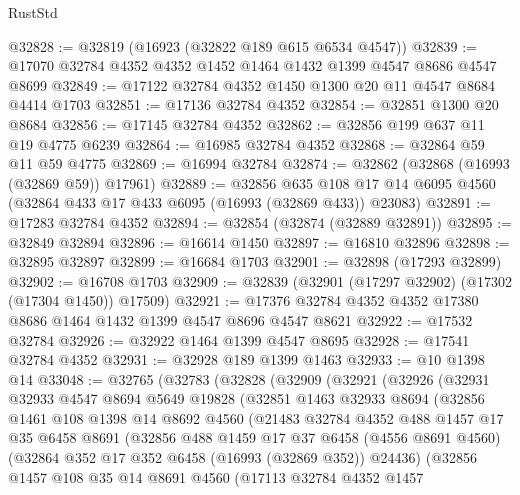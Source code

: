 \begin{lexlean}{RustStd}
\begin{coremodule}
@32828 := @32819 (@16923 (@32822 @189 @615 @6534 @4547))
@32839 := @17070 @32784 @4352 @4352 @1452 @1464 @1432 @1399 @4547 @8686 @4547 @8699
@32849 := @17122 @32784 @4352 @1450 @1300 @20 @11 @4547 @8684 @4414 @1703
@32851 := @17136 @32784 @4352
@32854 := @32851 @1300 @20 @8684
@32856 := @17145 @32784 @4352
@32862 := @32856 @199 @637 @11 @19 @4775 @6239
@32864 := @16985 @32784 @4352
@32868 := @32864 @59 @11 @59 @4775
@32869 := @16994 @32784
@32874 := @32862 (@32868 (@16993 (@32869 @59)) @17961)
@32889 := @32856
    @635
    @108
    @17
    @14
    @6095
    @4560
    (@32864 @433 @17 @433 @6095 (@16993 (@32869 @433)) @23083)
@32891 := @17283 @32784 @4352
@32894 := @32854 (@32874 (@32889 @32891))
@32895 := @32849 @32894
@32896 := @16614 @1450
@32897 := @16810 @32896
@32898 := @32895 @32897
@32899 := @16684 @1703
@32901 := @32898 (@17293 @32899)
@32902 := @16708 @1703
@32909 := @32839 (@32901 (@17297 @32902) (@17302 (@17304 @1450)) @17509)
@32921 := @17376 @32784 @4352 @4352 @17380 @8686 @1464 @1432 @1399 @4547 @8696 @4547 @8621
@32922 := @17532 @32784
@32926 := @32922 @1464 @1399 @4547 @8695
@32928 := @17541 @32784 @4352
@32931 := @32928 @189 @1399 @1463
@32933 := @10 @1398 @14
@33048 := @32765
    (@32783
      (@32828
        (@32909
          (@32921
            (@32926
              (@32931
                @32933
                @4547
                @8694
                @5649
                @19828
                (@32851
                  @1463
                  @32933
                  @8694
                  (@32856
                    @1461
                    @108
                    @1398
                    @14
                    @8692
                    @4560
                    (@21483
                      @32784
                      @4352
                      @488
                      @1457
                      @17
                      @35
                      @6458
                      @8691
                      (@32856
                        @488
                        @1459
                        @17
                        @37
                        @6458
                        (@4556 @8691 @4560)
                        (@32864 @352 @17 @352 @6458 (@16993 (@32869 @352)) @24436)
                        (@32856
                          @1457
                          @108
                          @35
                          @14
                          @8691
                          @4560
                          (@17113
                            @32784
                            @4352
                            @1457

\end{coremodule}
\end{lexlean}
